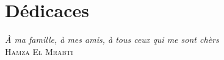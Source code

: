 \chapter*{Dédicaces}

\begin{flushright}
\emph{\`A ma famille, à mes amis, à tous ceux qui me sont chèrs } \\
\textsc{Hamza El Mrabti}\\
\end{flushright}






